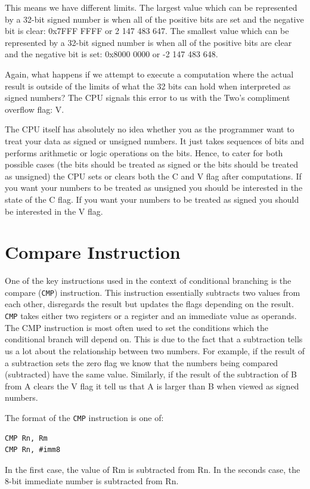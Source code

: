 This means we have different limits. The largest value which can be represented by a 32-bit signed number is when all of the positive bits are set and the negative bit is clear: 0x7FFF FFFF or 2 147 483 647. The smallest value which can be represented by a 32-bit signed number is when all of the positive bits are clear and the negative bit is set: 0x8000 0000 or -2 147 483 648.

Again, what happens if we attempt to execute a computation where the actual result is outside of the limits of what the 32 bits can hold when interpreted as signed numbers? The CPU signals this error to us with the Two's compliment overflow flag: V. 

The CPU itself has absolutely no idea whether you as the programmer want to treat your data as signed or unsigned numbers. It just takes sequences of bits and performs arithmetic or logic operations on the bits. Hence, to cater for both possible cases (the bits should be treated as signed or the bits should be treated as unsigned) the CPU sets or clears both the C and V flag after computations. If you want your numbers to be treated as unsigned you should be interested in the state of the C flag. If you want your numbers to be treated as signed you should be interested in the V flag. 

\section{Compare Instruction}
One of the key instructions used in the context of conditional branching is the compare (\texttt{CMP}) instruction. This instruction essentially subtracts two values from each other, disregards the result but updates the flags depending on the result. \texttt{CMP} takes either two registers or a register and an immediate value as operands. The CMP instruction is most often used to set the conditions which the conditional branch will depend on. This is due to the fact that a subtraction tells us a lot about the relationship between two numbers. For example, if the result of a subtraction sets the zero flag we know that the numbers being compared (subtracted) have the same value. Similarly, if the result of the subtraction of B from A clears the V flag it tell us that A is larger than B when viewed as signed numbers. 

The format of the \texttt{CMP} instruction is one of:
\begin{lstlisting}[fontadjust=true,frame=trBL]
CMP Rn, Rm
CMP Rn, #imm8
\end{lstlisting}
In the first case, the value of Rm is subtracted from Rn. In the seconds case, the 8-bit immediate number is subtracted from Rn.

